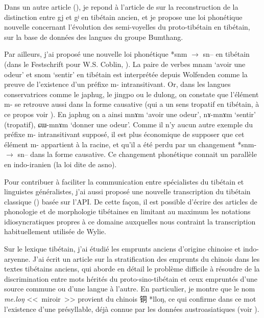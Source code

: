 \documentclass[oldfontcommands,oneside,a4paper,11pt]{memoir}
\newcommand{\ipa}[1]{{\phon #1}} %
\newcommand{\zh}[1]{{\cn #1}}
\begin{document}
Dans un autre article (\citealt{jacques13yod}), je repond à l'article de \citet{hill12gy} sur la reconstruction de la distinction entre \ipa{gj} et \ipa{gʲ} en tibétain ancien, et je propose une loi phonétique nouvelle concernant l'évolution des semi-voyelles du proto-tibétain en tibétain, sur la base de données des langues du groupe Bumthang.

Par ailleurs, j'ai proposé une nouvelle loi phonétique *snm $\rightarrow$ sn-- en tibétain (dans le Festschrift pour W.S. Coblin, \citealt{jacques14snom}). La paire de verbes \ipa{mnam} `avoir une odeur' et \ipa{snom} `sentir' en tibétain est interprétée depuis Wolfenden comme la preuve de l'existence d'un préfixe m- intransitivant. Or, dans les langues conservatrices comme le japhug, le jingpo ou le dulong, on constate que l'élément m- se retrouve aussi dans la forme causative (qui a un sens tropatif en tibétain, à ce propos voir \citealt{jacques13tropative}). En japhug on a ainsi \ipa{mnɤm} `avoir une odeur', \ipa{nɤ-mnɤm} `sentir' (tropatif), \ipa{ɕɯ-mnɤm} `donner une odeur'. Comme il n'y aucun autre exemple du préfixe m- intransitivant supposé, il est plus économique de supposer que cet élément m- appartient à la racine, et qu'il a été perdu par un changement *snm- $\rightarrow$ sn-- dans la forme causative. Ce changement phonétique connait un parallèle en indo-iranien (la loi dite de \ipa{asno}).

Pour contribuer à faciliter la communication entre spécialistes du tibétain et linguistes généralistes, j'ai aussi proposé une nouvelle transcription du tibétain classique (\citealt{jacques12transcription}) basée sur l'API. De cette façon, il est possible d'écrire des articles de phonologie et de morphologie tibétaines en limitant au maximum les notations idiosyncratiques propres à ce domaine auxquelles nous contraint la transcription habituellement utilisée de Wylie.

Sur le lexique tibétain, j’ai étudié les emprunts anciens d’origine chinoise et indo-aryenne. J’ai écrit un article sur la stratification des emprunts du chinois dans les textes tibétains anciens, qui aborde en détail le problème difficile à résoudre de la discrimination entre mots hérités du proto-sino-tibétain et ceux empruntés d’une source commune ou d’une langue à l’autre. En particulier, je montre que le nom \textit{me.loŋ} <<~miroir~>> provient du chinois \zh{铜} *lloŋ, ce qui confirme dans ce mot l'existence d'une présyllable, déjà connue par les données austroasiatiques (voir \citealt{sagart99roc}). 
\end{document}
